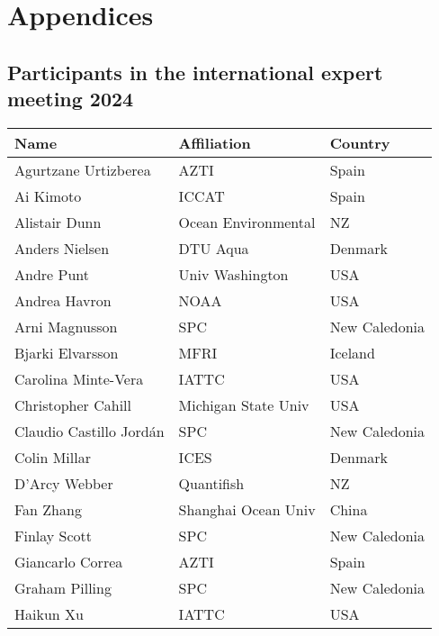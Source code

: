 \documentclass{SCreport}
\newcommand\I[1]{\rule{0pt}{#1}}
\begin{document}
\appendix

\section{Appendices}

\subsection{Participants in the international expert meeting 2024}
\label{sec:meeting-participants}

\vspace{2ex}

\begin{tabular}{lll}
  \hline
  Name                    & Affiliation          & Country\\
  \hline
  Agurtzane Urtizberea    & AZTI                 & Spain\I{2.8ex}\\
  Ai Kimoto               & ICCAT                & Spain\\
  Alistair Dunn           & Ocean Environmental  & NZ\\
  Anders Nielsen          & DTU Aqua             & Denmark\\
  Andre Punt              & Univ Washington      & USA\\
  Andrea Havron           & NOAA                 & USA\\
  Arni Magnusson          & SPC                  & New Caledonia\\
  Bjarki Elvarsson        & MFRI                 & Iceland\\
  Carolina Minte-Vera     & IATTC                & USA\\
  Christopher Cahill      & Michigan State Univ  & USA\\
  Claudio Castillo Jordán & SPC                  & New Caledonia\\
  Colin Millar            & ICES                 & Denmark\\
  D'Arcy Webber           & Quantifish           & NZ\\
  Fan Zhang               & Shanghai Ocean Univ  & China\\
  Finlay Scott            & SPC                  & New Caledonia\\
  Giancarlo Correa        & AZTI                 & Spain\\
  Graham Pilling          & SPC                  & New Caledonia\\
  Haikun Xu               & IATTC                & USA\\

\end{tabular}
\end{document}

